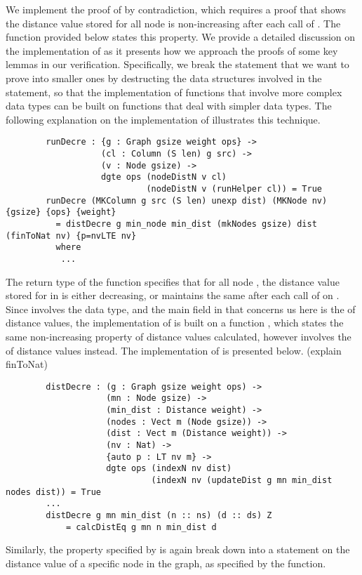 We implement the proof of  by contradiction, which requires a proof that shows the distance value stored for all node is non-increasing after each call of . The function  provided below states this property. We provide a detailed discussion on the implementation of  as it presents how we approach the proofs of some key lemmas in our verification. Specifically, we break the statement that we want to prove into smaller ones by destructing the data structures involved in the statement, so that the implementation of functions that involve more complex data types can be built on functions that deal with simpler data types. The following explanation on the implementation of  illustrates this technique. 
\begin{lstlisting}
		runDecre : {g : Graph gsize weight ops} ->
		           (cl : Column (S len) g src) ->
		           (v : Node gsize) ->
		           dgte ops (nodeDistN v cl) 
		           			(nodeDistN v (runHelper cl)) = True
		runDecre (MKColumn g src (S len) unexp dist) (MKNode nv) {gsize} {ops} {weight}
		  = distDecre g min_node min_dist (mkNodes gsize) dist (finToNat nv) {p=nvLTE nv}
		  where
		   ...
\end{lstlisting}

The return type of the  function specifies that for all node , the distance value stored for  in  is either decreasing, or maintains the same after each call of  on . Since  involves the  data type, and the main field in  that concerns us here is the  of distance values, the implementation of  is built on a function , which states the same non-increasing property of distance values calculated, however involves the  of distance values instead. The implementation of  is presented below. (explain finToNat)
\begin{lstlisting}
		distDecre : (g : Graph gsize weight ops) ->
		            (mn : Node gsize) ->
		            (min_dist : Distance weight) ->
		            (nodes : Vect m (Node gsize)) ->
		            (dist : Vect m (Distance weight)) ->
		            (nv : Nat) ->
		            {auto p : LT nv m} ->
		            dgte ops (indexN nv dist) 
		            		 (indexN nv (updateDist g mn min_dist nodes dist)) = True
		...
		distDecre g mn min_dist (n :: ns) (d :: ds) Z 
			= calcDistEq g mn n min_dist d
\end{lstlisting}

Similarly, the property specified by  is again break down into a statement on the distance value of a specific node in the graph, as specified by the  function.